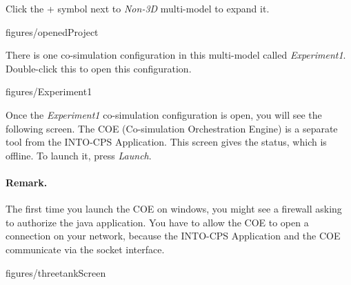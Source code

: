 \documentclass[11pt,a4paper]{../tutorial}
\begin{document}
\begin{instructions}
\item Click the + symbol next to \emph{Non-3D} multi-model to expand it.

    \begin{annotation}[width=0.53\linewidth,trim=0 0 250 200,clip]{figures/openedProject}
    \end{annotation}

\newpage
\item There is one co-simulation configuration in this multi-model called \emph{Experiment1}. Double-click this to open this configuration.

    \begin{annotation}[width=0.53\linewidth,trim=0 0 250 200,clip]{figures/Experiment1}
    \end{annotation}

\item \label{step:launch} Once the \emph{Experiment1} co-simulation configuration is open, you will see the following screen. The COE (Co-simulation Orchestration Engine) is a separate tool from the INTO-CPS Application. This screen gives the status, which is offline. To launch it, press \emph{Launch}.

\paragraph{Remark.} The first time you launch the COE on windows, you might see a firewall asking to authorize the java application. You have to allow the COE to open a connection on your network, because the INTO-CPS Application and the COE communicate via the socket interface.

    \begin{annotation}[width=0.85\linewidth,trim=0 0 0 0,clip]{figures/threetankScreen}
    \end{annotation}

%


\end{instructions}
\end{document}
